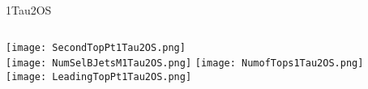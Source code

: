 \documentclass{beamer}
\begin{document}
\begin{frame}{1Tau2OS}
    \begin{columns}[t]
    \centering
    \texttt{[image: SecondTopPt1Tau2OS.png]}\\
    \texttt{[image: NumSelBJetsM1Tau2OS.png]}
    \centering
    \texttt{[image: NumofTops1Tau2OS.png]}\\
    \texttt{[image: LeadingTopPt1Tau2OS.png]}
    \end{columns}
\end{frame}
\end{document}
